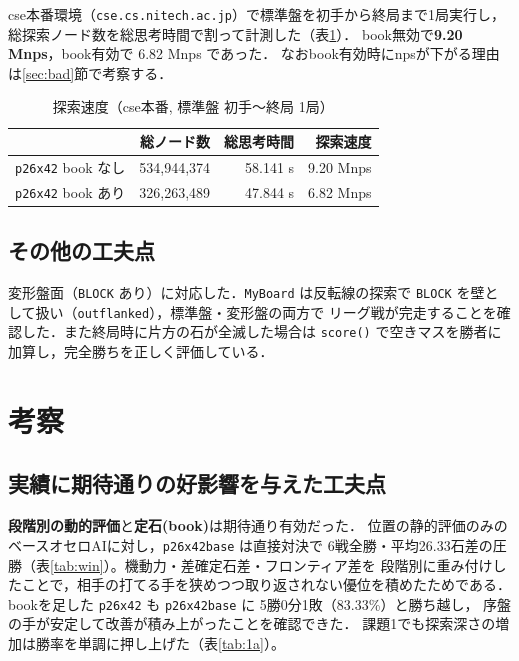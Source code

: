 \documentclass[11pt,a4j]{ujarticle} %
\begin{document}
cse本番環境（{\tt cse.cs.nitech.ac.jp}）で標準盤を初手から終局まで1局実行し，
総探索ノード数を総思考時間で割って計測した（表\ref{tab:nps}）．
book無効で\textbf{9.20 Mnps}，book有効で 6.82 Mnps であった．
なおbook有効時にnpsが下がる理由は\ref{sec:bad}節で考察する．

\begin{table}[h]\center
\caption{探索速度（cse本番, 標準盤 初手〜終局 1局）}\label{tab:nps}
\begin{tabular}{l|r|r|r}
 & 総ノード数 & 総思考時間 & 探索速度 \\ \hline\hline
{\tt p26x42} book なし & 534{,}944{,}374 & 58.141 s & 9.20 Mnps \\
{\tt p26x42} book あり & 326{,}263{,}489 & 47.844 s & 6.82 Mnps \\
\end{tabular}
\end{table}

\subsection{その他の工夫点}

変形盤面（{\verb+BLOCK+} あり）に対応した．{\verb+MyBoard+} は反転線の探索で
{\verb+BLOCK+} を壁として扱い（{\verb+outflanked+}），標準盤・変形盤の両方で
リーグ戦が完走することを確認した．また終局時に片方の石が全滅した場合は
{\verb+score()+} で空きマスを勝者に加算し，完全勝ちを正しく評価している．

\section{考察}

\subsection{実績に期待通りの好影響を与えた工夫点}

\textbf{段階別の動的評価}と\textbf{定石(book)}は期待通り有効だった．
位置の静的評価のみのベースオセロAIに対し，{\verb+p26x42base+} は直接対決で
6戦全勝・平均26.33石差の圧勝（表\ref{tab:win}）。機動力・差確定石差・フロンティア差を
段階別に重み付けしたことで，相手の打てる手を狭めつつ取り返されない優位を積めたためである．
bookを足した {\verb+p26x42+} も {\verb+p26x42base+} に 5勝0分1敗（83.33\%）と勝ち越し，
序盤の手が安定して改善が積み上がったことを確認できた．
課題1でも探索深さの増加は勝率を単調に押し上げた（表\ref{tab:1a}）。
\end{document}
